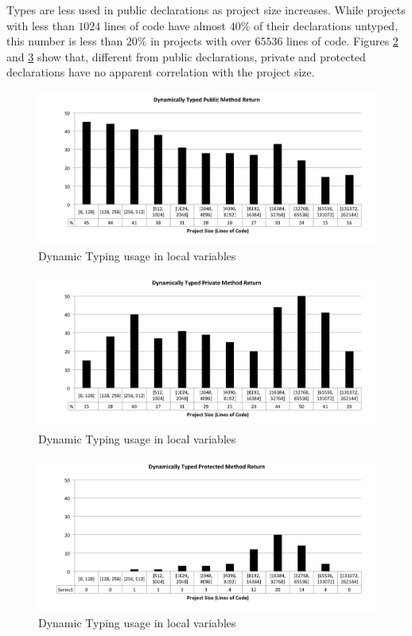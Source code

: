 \documentclass[preprint]{sigplanconf}
\begin{document}
Types are less used in public declarations as project size increases.
While projects with less than $1024$ lines of code have almost $40\%$ of their declarations untyped, this number is  less than $20\%$ in projects with over $65536$ lines of code. 
Figures \ref{fig:size_priMethodReturn} and \ref{fig:size_proMethodReturn} show that, different from public declarations, private and protected declarations have no apparent correlation with the project size.

\begin{figure}[ht]
\centering 
\includegraphics[width=1\textwidth]{images/size_pubMethodReturn} 
\caption{Dynamic Typing usage in local variables}
\label{fig:size_pubMethodReturn} 
\end{figure}

\begin{figure}[ht]
\centering 
\includegraphics[width=1\textwidth]{images/size_priMethodReturn} 
\caption{Dynamic Typing usage in local variables}
\label{fig:size_priMethodReturn} 
\end{figure}

\begin{figure}[ht]
\centering 
\includegraphics[width=1\textwidth]{images/size_proMethodReturn} 
\caption{Dynamic Typing usage in local variables}
\label{fig:size_proMethodReturn} 
\end{figure}
\end{document}
